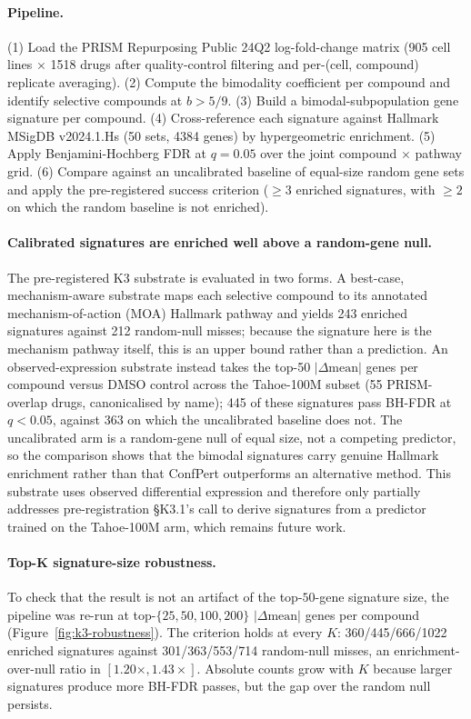 \documentclass{article}
\begin{document}
\paragraph{Pipeline.} (1) Load the PRISM Repurposing Public 24Q2 log-fold-change matrix (905 cell lines $\times$ 1518 drugs after quality-control filtering and per-(cell, compound) replicate averaging). (2) Compute the bimodality coefficient per compound and identify selective compounds at $b > 5/9$. (3) Build a bimodal-subpopulation gene signature per compound. (4) Cross-reference each signature against Hallmark MSigDB v2024.1.Hs (50 sets, 4384 genes) by hypergeometric enrichment. (5) Apply Benjamini-Hochberg FDR at $q = 0.05$ over the joint compound $\times$ pathway grid. (6) Compare against an uncalibrated baseline of equal-size random gene sets and apply the pre-registered success criterion ($\geq 3$ enriched signatures, with $\geq 2$ on which the random baseline is not enriched).

\paragraph{Calibrated signatures are enriched well above a random-gene null.} The pre-registered K3 substrate is evaluated in two forms. A best-case, mechanism-aware substrate maps each selective compound to its annotated mechanism-of-action (MOA) Hallmark pathway and yields 243 enriched signatures against 212 random-null misses; because the signature here is the mechanism pathway itself, this is an upper bound rather than a prediction. An observed-expression substrate instead takes the top-50 $|\Delta\text{mean}|$ genes per compound versus DMSO control across the Tahoe-100M subset (55 PRISM-overlap drugs, canonicalised by name); 445 of these signatures pass BH-FDR at $q < 0.05$, against 363 on which the uncalibrated baseline does not. The uncalibrated arm is a random-gene null of equal size, not a competing predictor, so the comparison shows that the bimodal signatures carry genuine Hallmark enrichment rather than that ConfPert outperforms an alternative method. This substrate uses observed differential expression and therefore only partially addresses pre-registration \S K3.1's call to derive signatures from a predictor trained on the Tahoe-100M arm, which remains future work.

\paragraph{Top-K signature-size robustness.} To check that the result is not an artifact of the top-$50$-gene signature size, the pipeline was re-run at top-$\{25, 50, 100, 200\}$ $|\Delta\text{mean}|$ genes per compound (Figure~\ref{fig:k3-robustness}). The criterion holds at every $K$: 360/445/666/1022 enriched signatures against 301/363/553/714 random-null misses, an enrichment-over-null ratio in $[1.20\times, 1.43\times]$. Absolute counts grow with $K$ because larger signatures produce more BH-FDR passes, but the gap over the random null persists.
\end{document}

